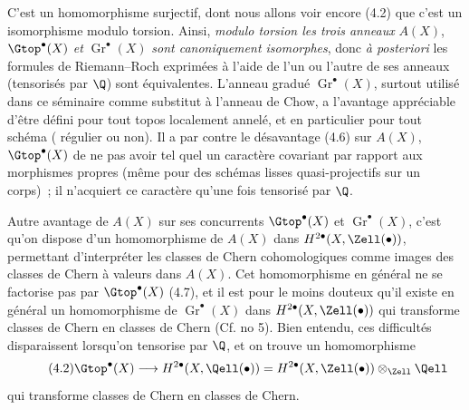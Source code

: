 C'est un homomorphisme surjectif, dont nous allons voir encore (4.2) que c'est un isomorphisme modulo torsion. Ainsi, \emph{modulo torsion les trois anneaux} $A(X)$, $\Gtop^\bullet(X)$ \emph{et} $\operatorname{Gr}^\bullet(X)$ \emph{sont canoniquement isomorphes}, donc \emph{à posteriori} les formules de Riemann--Roch exprimées à l'aide de l'un ou l'autre de ses anneaux (tensorisés par $\Q$) sont équivalentes. L'anneau gradué $\operatorname{Gr}^\bullet(X)$, surtout utilisé dans ce séminaire comme substitut à l'anneau de Chow, a l'avantage appréciable d'être défini pour tout topos localement annelé, et en particulier pour tout schéma (
régulier ou non). Il a par contre le désavantage (4.6) sur $A(X)$, $\Gtop^\bullet(X)$ de ne pas avoir tel quel un caractère covariant par rapport aux morphismes propres (même pour des schémas lisses quasi-projectifs sur un corps)~; il n'acquiert ce caractère qu'une fois tensorisé par $\Q$.

Autre avantage de $A(X)$ sur ses concurrents $\Gtop^\bullet(X)$ et $\operatorname{Gr}^\bullet(X)$, c'est qu'on dispose d'un homomorphisme de $A(X)$ dans $H^{2\bullet}(X,\Zell(\bullet))$, permettant d'interpréter les classes de Chern cohomologiques comme images des classes de Chern à valeurs dans $A(X)$. Cet homomorphisme en général ne se factorise pas par $\Gtop^\bullet(X)$ (4.7), et il est pour le moins douteux qu'il existe en général un homomorphisme de $\operatorname{Gr}^\bullet(X)$ dans $H^{2\bullet}(X,\Zell(\bullet))$ qui transforme classes de Chern en classes de Chern (Cf. no 5). Bien entendu, ces difficultés disparaissent lorsqu'on tensorise par $\Q$, et on trouve un homomorphisme
\begin{equation}\tag{4.2}
 \Gtop^\bullet(X)\longrightarrow H^{2\bullet}(X,\Qell(\bullet))=
 H^{2\bullet}(X,\Zell(\bullet))\otimes_{\Zell}\Qell
\end{equation}
qui transforme classes de Chern en classes de Chern.

